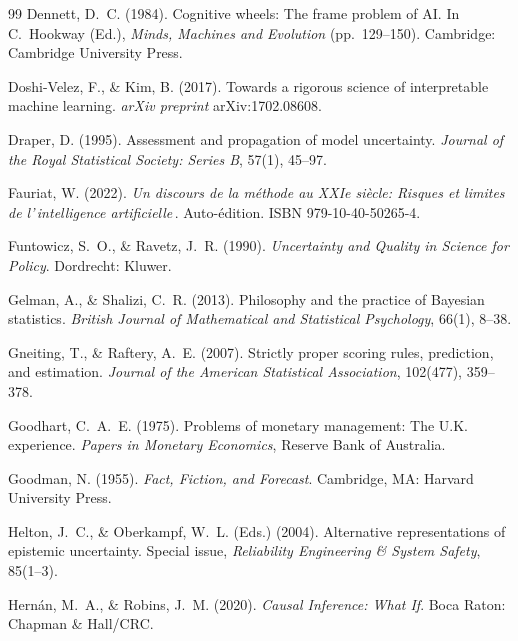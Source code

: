 \documentclass[11pt,a4paper]{article}
\begin{document}
\begin{thebibliography}{99}
Dennett, D.~C. (1984). Cognitive wheels: The frame problem of AI. In
C.~Hookway (Ed.), \emph{Minds, Machines and Evolution} (pp.~129--150).
Cambridge: Cambridge University Press.

Doshi-Velez, F., \& Kim, B. (2017). Towards a rigorous science of
interpretable machine learning. \emph{arXiv preprint} arXiv:1702.08608.

Draper, D. (1995). Assessment and propagation of model uncertainty.
\emph{Journal of the Royal Statistical Society: Series B}, 57(1), 45--97.

Fauriat, W. (2022). \emph{Un discours de la m\'ethode au XXIe si\`ecle:
Risques et limites de l'\guillemotleft\,intelligence artificielle\,\guillemotright}.
Auto-\'edition. ISBN 979-10-40-50265-4.

Funtowicz, S.~O., \& Ravetz, J.~R. (1990). \emph{Uncertainty and Quality
in Science for Policy}. Dordrecht: Kluwer.

Gelman, A., \& Shalizi, C.~R. (2013). Philosophy and the practice of
Bayesian statistics. \emph{British Journal of Mathematical and
Statistical Psychology}, 66(1), 8--38.

Gneiting, T., \& Raftery, A.~E. (2007). Strictly proper scoring rules,
prediction, and estimation. \emph{Journal of the American Statistical
Association}, 102(477), 359--378.

Goodhart, C.~A.~E. (1975). Problems of monetary management: The U.K.
experience. \emph{Papers in Monetary Economics}, Reserve Bank of
Australia.

Goodman, N. (1955). \emph{Fact, Fiction, and Forecast}. Cambridge, MA:
Harvard University Press.

Helton, J.~C., \& Oberkampf, W.~L. (Eds.) (2004). Alternative
representations of epistemic uncertainty. Special issue,
\emph{Reliability Engineering \& System Safety}, 85(1--3).

Hern\'an, M.~A., \& Robins, J.~M. (2020). \emph{Causal Inference: What
If}. Boca Raton: Chapman \& Hall/CRC.


\end{thebibliography}
\end{document}
